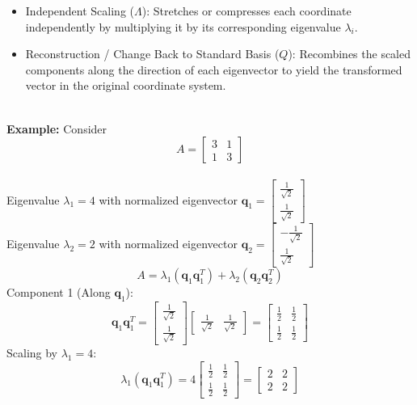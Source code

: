 \documentclass[DIV=20,oneside]{scrartcl}
\newcommand{\example}{
	\noindent\textbf{\\Example: }
}
\begin{document}
\begin{itemize}
{\begin{itemize}
			\item Independent Scaling ($\Lambda$): Stretches or compresses each coordinate independently by multiplying it by its corresponding eigenvalue $\lambda_i$.
			\item Reconstruction / Change Back to Standard Basis ($Q$): Recombines the scaled components along the direction of each eigenvector to yield the transformed vector in the original coordinate system.
		\end{itemize}
	}
	\example Consider $$A = \begin{bmatrix} 3 & 1 \\ 1 & 3 \end{bmatrix}$$\\
	Eigenvalue $\lambda_1 = 4$ with normalized eigenvector $\mathbf{q}_1 = \begin{bmatrix} \frac{1}{\sqrt{2}} \\ \frac{1}{\sqrt{2}} \end{bmatrix}$\\Eigenvalue $\lambda_2 = 2$ with normalized eigenvector $\mathbf{q}_2 = \begin{bmatrix} -\frac{1}{\sqrt{2}} \\ \frac{1}{\sqrt{2}} \end{bmatrix}$
	$$A = \lambda_1 (\mathbf{q}_1 \mathbf{q}_1^T) + \lambda_2 (\mathbf{q}_2 \mathbf{q}_2^T)$$
	Component 1 (Along $\mathbf{q}_1$):
	$$\mathbf{q}_1 \mathbf{q}_1^T = \begin{bmatrix} \frac{1}{\sqrt{2}} \\ \frac{1}{\sqrt{2}} \end{bmatrix} \begin{bmatrix} \frac{1}{\sqrt{2}} & \frac{1}{\sqrt{2}} \end{bmatrix} = \begin{bmatrix} \frac{1}{2} & \frac{1}{2} \\ \frac{1}{2} & \frac{1}{2} \end{bmatrix}$$
	Scaling by $\lambda_1 = 4$:$$\lambda_1 (\mathbf{q}_1 \mathbf{q}_1^T) = 4 \begin{bmatrix} \frac{1}{2} & \frac{1}{2} \\ \frac{1}{2} & \frac{1}{2} \end{bmatrix} = \begin{bmatrix} 2 & 2 \\ 2 & 2 \end{bmatrix}$$

\end{itemize}
\end{document}
